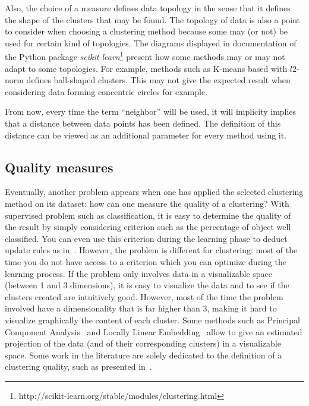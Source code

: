 \documentclass[a4paper]{report}
\begin{document}
    Also, the choice of a measure defines data topology in the sense that it defines the shape of the clusters that may be found. The topology of data is also a point to consider when choosing a clustering method because some may (or not) be used for certain kind of topologies. The diagrams displayed in documentation of the Python package \textit{scikit-learn}\footnote{http://scikit-learn.org/stable/modules/clustering.html} present how some methods may or may not adapt to some topologies. For example, methods such as K-means based with $l2$-norm defines ball-shaped clusters. This may not give the expected result when considering data forming concentric circles for example.

    From now, every time the term ``neighbor'' will be used, it will implicity implies that a distance between data points has been defined. The definition of this distance can be viewed as an additional parameter for every method using it.

    \subsection{Quality measures}
\label{sec:quality_measures}
    Eventually, another problem appears when one has applied the selected clustering method on its dataset: how can one measure the quality of a clustering? With supervised problem such as classification, it is easy to determine the quality of the result by simply considering criterion such as the percentage of object well classified. You can even use this criterion during the learning phase to deduct update rules as in~\cite{vincent2010stacked}. However, the problem is different for clustering: most of the time you do not have access to a criterion which you can optimize during the learning process. If the problem only involves data in a visualizable space (between 1 and 3 dimensions), it is easy to visualize the data and to see if the clusters created are intuitively good. However, most of the time the problem involved have a dimensionality that is far higher than 3, making it hard to visualize graphically the content of each cluster. Some methods such as Principal Component Analysis~\cite{wold1987principal} and Locally Linear Embedding~\cite{roweis2000nonlinear} allow to give an estimated projection of the data (and of their corresponding clusters) in a visualizable space. Some work in the literature are solely dedicated to the definition of a clustering quality, such as presented in~\cite{ben2009measures}.
\end{document}
